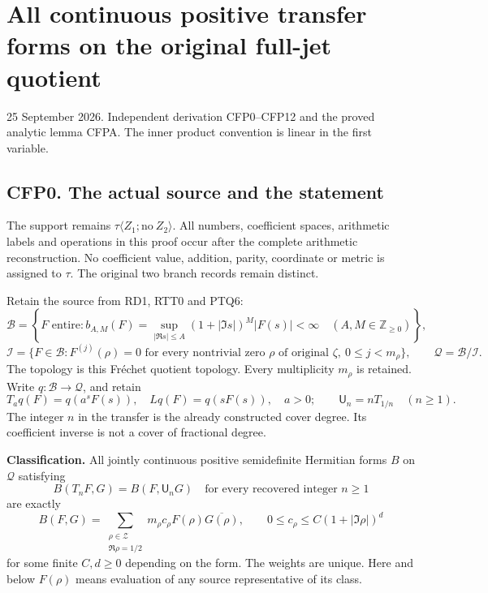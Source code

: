 \section{All continuous positive transfer forms on the original full-jet
quotient}\label{all-continuous-positive-transfer-forms-on-the-original-full-jet-quotient}

25 September 2026. Independent derivation CFP0--CFP12 and the proved
analytic lemma CFPA. The inner product convention is linear in the first
variable.

\subsection{CFP0. The actual source and the
statement}\label{cfp0.-the-actual-source-and-the-statement}

The support remains \(\tau\langle Z_1;\mathrm{no}\ Z_2\rangle\). All
numbers, coefficient spaces, arithmetic labels and operations in this
proof occur after the complete arithmetic reconstruction. No coefficient
value, addition, parity, coordinate or metric is assigned to \(\tau\).
The original two branch records remain distinct.

Retain the source from RD1, RTT0 and PTQ6: \[
\mathcal B=\left\{F\text{ entire}:b_{A,M}(F)=
\sup_{|\Re s|\le A}(1+|\Im s|)^M|F(s)|<\infty
\quad(A,M\in\mathbb Z_{\ge0})\right\},
\] \[
\mathcal I=\{F\in\mathcal B:F^{(j)}(\rho)=0
\text{ for every nontrivial zero }\rho\text{ of original }\zeta,
\ 0\le j<m_\rho\},\qquad
\mathcal Q=\mathcal B/\mathcal I.
\tag{CFP0.1}
\] The topology is this Fréchet quotient topology. Every multiplicity
\(m_\rho\) is retained. Write \(q:\mathcal B\to\mathcal Q\), and retain
\[
T_aq(F)=q(a^sF(s)),\quad Lq(F)=q(sF(s)),\quad a>0;
\qquad \mathsf U_n=nT_{1/n}\quad(n\ge1).
\tag{CFP0.2}
\] The integer \(n\) in the transfer is the already constructed cover
degree. Its coefficient inverse is not a cover of fractional degree.

\textbf{Classification.} All jointly continuous positive semidefinite
Hermitian forms \(B\) on \(\mathcal Q\) satisfying \[
B(T_nF,G)=B(F,\mathsf U_nG)
\quad\text{for every recovered integer }n\ge1
\tag{CFP0.3}
\] are exactly \[
\boxed{B(F,G)=\sum_{\substack{\rho\in\mathscr Z\\\Re\rho=1/2}}
m_\rho c_\rho F(\rho)\overline{G(\rho)},\qquad
0\le c_\rho\le C(1+|\Im\rho|)^d}
\tag{CFP0.4}
\] for some finite \(C,d\ge0\) depending on the form. The weights are
unique. Here and below \(F(\rho)\) means evaluation of any source
representative of its class.

